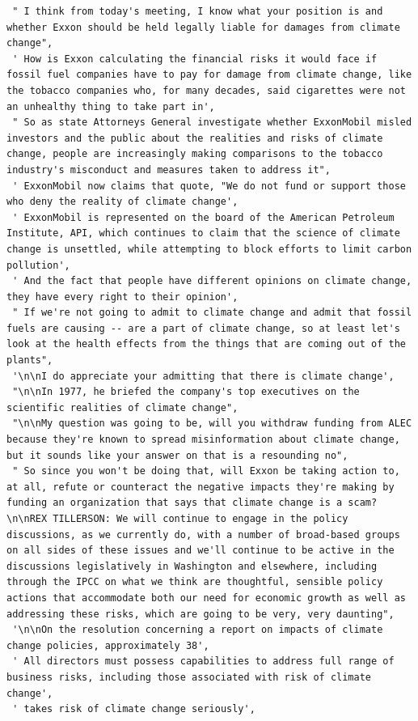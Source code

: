 \documentclass[
  letterpaper,
  DIV=11,
  numbers=noendperiod]{scrreprt}
\begin{document}
\begin{verbatim}
 " I think from today's meeting, I know what your position is and whether Exxon should be held legally liable for damages from climate change",
 ' How is Exxon calculating the financial risks it would face if fossil fuel companies have to pay for damage from climate change, like the tobacco companies who, for many decades, said cigarettes were not an unhealthy thing to take part in',
 " So as state Attorneys General investigate whether ExxonMobil misled investors and the public about the realities and risks of climate change, people are increasingly making comparisons to the tobacco industry's misconduct and measures taken to address it",
 ' ExxonMobil now claims that quote, "We do not fund or support those who deny the reality of climate change',
 ' ExxonMobil is represented on the board of the American Petroleum Institute, API, which continues to claim that the science of climate change is unsettled, while attempting to block efforts to limit carbon pollution',
 ' And the fact that people have different opinions on climate change, they have every right to their opinion',
 " If we're not going to admit to climate change and admit that fossil fuels are causing -- are a part of climate change, so at least let's look at the health effects from the things that are coming out of the plants",
 '\n\nI do appreciate your admitting that there is climate change',
 "\n\nIn 1977, he briefed the company's top executives on the scientific realities of climate change",
 "\n\nMy question was going to be, will you withdraw funding from ALEC because they're known to spread misinformation about climate change, but it sounds like your answer on that is a resounding no",
 " So since you won't be doing that, will Exxon be taking action to, at all, refute or counteract the negative impacts they're making by funding an organization that says that climate change is a scam?\n\nREX TILLERSON: We will continue to engage in the policy discussions, as we currently do, with a number of broad-based groups on all sides of these issues and we'll continue to be active in the discussions legislatively in Washington and elsewhere, including through the IPCC on what we think are thoughtful, sensible policy actions that accommodate both our need for economic growth as well as addressing these risks, which are going to be very, very daunting",
 '\n\nOn the resolution concerning a report on impacts of climate change policies, approximately 38',
 ' All directors must possess capabilities to address full range of business risks, including those associated with risk of climate change',
 ' takes risk of climate change seriously',

\end{verbatim}
\end{document}
